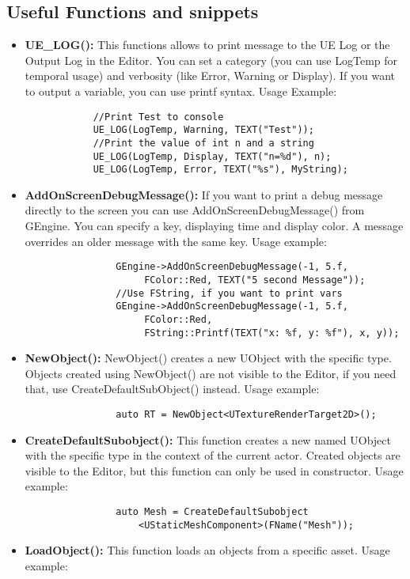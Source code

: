 \documentclass[10pt,a4paper]{article}
\begin{document}
\begin{multicols*}{2}
	\subsection{Useful Functions and snippets}
	\begin{itemize}
			\item \textbf{UE\_LOG():} This functions allows to print message to the UE Log or the Output Log in the Editor. You can set a category (you can use LogTemp for temporal usage) and verbosity (like Error, Warning or Display). If you want to output a variable, you can use printf syntax.  Usage Example:
			\begin{verbatim}
			//Print Test to console
			UE_LOG(LogTemp, Warning, TEXT("Test"));
			//Print the value of int n and a string
			UE_LOG(LogTemp, Display, TEXT("n=%d"), n);
			UE_LOG(LogTemp, Error, TEXT("%s"), MyString);
			\end{verbatim}
			\item \textbf{AddOnScreenDebugMessage():} If you want to print a debug message directly to the screen you can use AddOnScreenDebugMessage() from GEngine. You can specify a key, displaying time and display color. A message overrides an older message with the same key. Usage example:
			\begin{verbatim}
				GEngine->AddOnScreenDebugMessage(-1, 5.f, 
				     FColor::Red, TEXT("5 second Message"));
				//Use FString, if you want to print vars
				GEngine->AddOnScreenDebugMessage(-1, 5.f, 
				     FColor::Red, 
				     FString::Printf(TEXT("x: %f, y: %f"), x, y));
			\end{verbatim}
			\item \textbf{NewObject():} NewObject() creates a new UObject with the specific type. Objects created using NewObject() are not visible to the Editor, if you need that, use CreateDefaultSubObject() instead. Usage example:
			\begin{verbatim}
				auto RT = NewObject<UTextureRenderTarget2D>();
			\end{verbatim}
			\item \textbf{CreateDefaultSubobject():} This function creates a new named UObject with the specific type in the context of the current actor. Created objects are visible to the Editor, but this function can only be used in constructor. Usage example:
			\begin{verbatim}
				auto Mesh = CreateDefaultSubobject
				    <UStaticMeshComponent>(FName("Mesh"));
			\end{verbatim}
			\item \textbf{LoadObject():} This function loads an objects from a specific asset. Usage example:

\end{itemize}
\end{multicols*}
\end{document}
